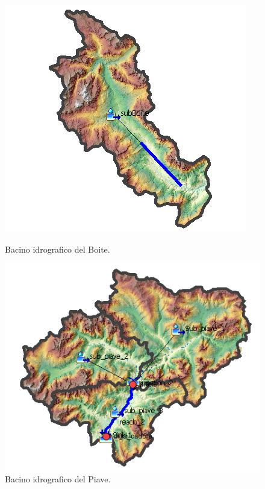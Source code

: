 \begin{figure}[htb] \centering
    \begin{minipage}[]{7cm}
        \includegraphics[scale=0.73]{immagini/bac_boite.PNG}
        \caption{Bacino idrografico del Boite.}
    \label{minipage:bacino_boite}    
    \end{minipage}
        \hspace{2cm}
    \begin{minipage}[]{7cm}
        \includegraphics[scale=0.75]{immagini/bac_piave.PNG}
        \caption{Bacino idrografico del Piave.}
    \label{minipage:bacino_piave}
    \end{minipage} 
        \end{figure}

